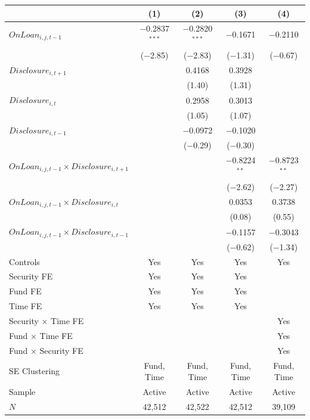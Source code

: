 {\footnotesize
\begin{tabular}{l*{4}{c}}
\toprule
 & (1) & (2) & (3) & (4) \\
\midrule
$\mathit{OnLoan}_{i,j,t-1}$ & $-$0.2837$^{***}$ & $-$0.2820$^{***}$ & $-$0.1671 & $-$0.2110 \\
 & ($-$2.85) & ($-$2.83) & ($-$1.31) & ($-$0.67) \\[0.3em]
$\mathit{Disclosure}_{i,t+1}$ & & 0.4168 & 0.3928 & \\
 & & (1.40) & (1.31) & \\[0.3em]
$\mathit{Disclosure}_{i,t}$ & & 0.2958 & 0.3013 & \\
 & & (1.05) & (1.07) & \\[0.3em]
$\mathit{Disclosure}_{i,t-1}$ & & $-$0.0972 & $-$0.1020 & \\
 & & ($-$0.29) & ($-$0.30) & \\[0.3em]
$\mathit{OnLoan}_{i,j,t-1} \times \mathit{Disclosure}_{i,t+1}$ & & & $-$0.8224$^{**}$ & $-$0.8723$^{**}$ \\
 & & & ($-$2.62) & ($-$2.27) \\[0.3em]
$\mathit{OnLoan}_{i,j,t-1} \times \mathit{Disclosure}_{i,t}$ & & & 0.0353 & 0.3738 \\
 & & & (0.08) & (0.55) \\[0.3em]
$\mathit{OnLoan}_{i,j,t-1} \times \mathit{Disclosure}_{i,t-1}$ & & & $-$0.1157 & $-$0.3043 \\
 & & & ($-$0.62) & ($-$1.34) \\
\midrule
Controls & Yes & Yes & Yes & Yes \\
\midrule
Security FE & Yes & Yes & Yes & \\
Fund FE & Yes & Yes & Yes & \\
Time FE & Yes & Yes & Yes & \\
Security $\times$ Time FE & & & & Yes \\
Fund $\times$ Time FE & & & & Yes \\
Fund $\times$ Security FE & & & & Yes \\
\midrule
SE Clustering & Fund, Time & Fund, Time & Fund, Time & Fund, Time \\
Sample & Active & Active & Active & Active \\
$N$ & 42,512 & 42,522 & 42,512 & 39,109 \\
\bottomrule
\end{tabular}
}
\par\smallskip

